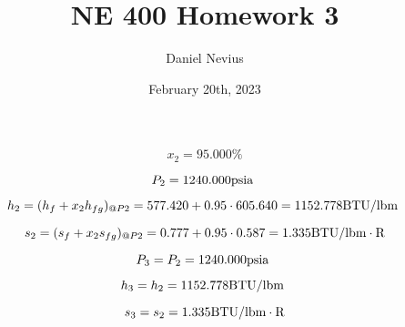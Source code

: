 \documentclass{article}
\title{NE 400 Homework 3}
\author{Daniel Nevius}
\date{February 20th, 2023}
\begin{document}
\maketitle

\section{}

\begin{equation}
x_{ 2} =   95.000\%
\end{equation}

\begin{equation}
P_{ 2} = 1240.000\textnormal{psia                      }
\end{equation}

\begin{equation}
  h_{ 2} = (h_{f} + x_{ 2}h_{fg})_{@P 2} =  577.420 + 0.95\cdot 605.640 = 1152.778
\textnormal{BTU/lbm                   }
\end{equation}

\begin{equation}
  s_{ 2} = (s_{f} + x_{ 2}s_{fg})_{@P 2} =    0.777 + 0.95\cdot   0.587 =    1.335
\textnormal{BTU/lbm}\cdot\textnormal{R}
\end{equation}

\begin{equation}
P_{ 3} = P_{ 2} = 1240.000\textnormal{psia                      }
\end{equation}

\begin{equation}
h_{ 3} = h_{ 2} = 1152.778\textnormal{BTU/lbm                   }
\end{equation}

\begin{equation}
s_{ 3} = s_{ 2} =    1.335\textnormal{BTU/lbm}\cdot\textnormal{R}
\end{equation}
\end{document}
